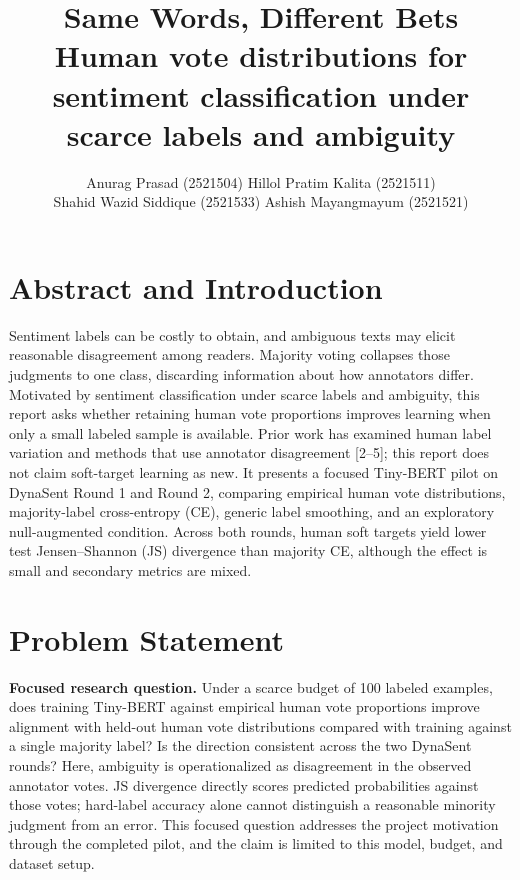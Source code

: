 \documentclass[11pt,a4paper]{article}
\title{\vspace{-1.0cm}\textbf{Same Words, Different Bets}\\[-1pt]
\large Human vote distributions for sentiment classification under scarce labels and ambiguity}
\author{Anurag Prasad (2521504) \quad Hillol Pratim Kalita (2521511)\\
Shahid Wazid Siddique (2521533) \quad Ashish Mayangmayum (2521521)}
\date{}
\begin{document}
\maketitle
\vspace{-0.65cm}

\section{Abstract and Introduction}
Sentiment labels can be costly to obtain, and ambiguous texts may elicit reasonable disagreement among readers. Majority voting collapses those judgments to one class, discarding information about how annotators differ. Motivated by sentiment classification under scarce labels and ambiguity, this report asks whether retaining human vote proportions improves learning when only a small labeled sample is available. Prior work has examined human label variation and methods that use annotator disagreement [2--5]; this report does not claim soft-target learning as new. It presents a focused Tiny-BERT pilot on DynaSent Round 1 and Round 2, comparing empirical human vote distributions, majority-label cross-entropy (CE), generic label smoothing, and an exploratory null-augmented condition. Across both rounds, human soft targets yield lower test Jensen--Shannon (JS) divergence than majority CE, although the effect is small and secondary metrics are mixed.

\section{Problem Statement}
\textbf{Focused research question.} Under a scarce budget of 100 labeled examples, does training Tiny-BERT against empirical human vote proportions improve alignment with held-out human vote distributions compared with training against a single majority label? Is the direction consistent across the two DynaSent rounds? Here, ambiguity is operationalized as disagreement in the observed annotator votes. JS divergence directly scores predicted probabilities against those votes; hard-label accuracy alone cannot distinguish a reasonable minority judgment from an error. This focused question addresses the project motivation through the completed pilot, and the claim is limited to this model, budget, and dataset setup.
\end{document}
